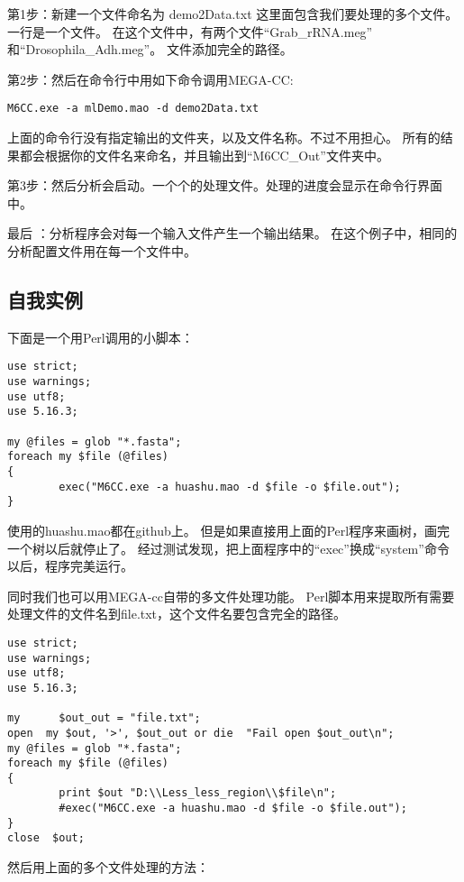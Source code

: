 \documentclass{ctexart}
\begin{document}
第1步：新建一个文件命名为 demo2Data.txt 这里面包含我们要处理的多个文件。
        一行是一个文件。
        在这个文件中，有两个文件“Grab\_rRNA.meg” 和“Drosophila\_Adh.meg”。
        文件添加完全的路径。

第2步：然后在命令行中用如下命令调用MEGA-CC:

\lstset{frame=trBL,frameround=fttt,breaklines=true,language=Perl}
\begin{lstlisting}
M6CC.exe -a mlDemo.mao -d demo2Data.txt
\end{lstlisting}
        
      
       上面的命令行没有指定输出的文件夹，以及文件名称。不过不用担心。
       所有的结果都会根据你的文件名来命名，并且输出到“M6CC\_Out”文件夹中。

第3步：然后分析会启动。一个个的处理文件。处理的进度会显示在命令行界面中。

最后 ：分析程序会对每一个输入文件产生一个输出结果。
        在这个例子中，相同的分析配置文件用在每一个文件中。
\subsection{自我实例}
\label{sec-3-8}

下面是一个用Perl调用的小脚本：

\lstset{frame=trBL,frameround=fttt,breaklines=true,language=Perl}
\begin{lstlisting}
use strict;
use warnings;
use utf8;
use 5.16.3;

my @files = glob "*.fasta";
foreach my $file (@files)
{
        exec("M6CC.exe -a huashu.mao -d $file -o $file.out");
}
\end{lstlisting}
使用的huashu.mao都在github上。
但是如果直接用上面的Perl程序来画树，画完一个树以后就停止了。
经过测试发现，把上面程序中的“exec”换成“system”命令以后，程序完美运行。

同时我们也可以用MEGA-cc自带的多文件处理功能。
Perl脚本用来提取所有需要处理文件的文件名到file.txt，这个文件名要包含完全的路径。

\lstset{frame=trBL,frameround=fttt,breaklines=true,language=Perl}
\begin{lstlisting}
use strict;
use warnings;
use utf8;
use 5.16.3;

my      $out_out = "file.txt";
open  my $out, '>', $out_out or die  "Fail open $out_out\n";
my @files = glob "*.fasta";
foreach my $file (@files)
{
        print $out "D:\\Less_less_region\\$file\n";
        #exec("M6CC.exe -a huashu.mao -d $file -o $file.out");
}
close  $out;
\end{lstlisting}
然后用上面的多个文件处理的方法：
\end{document}
